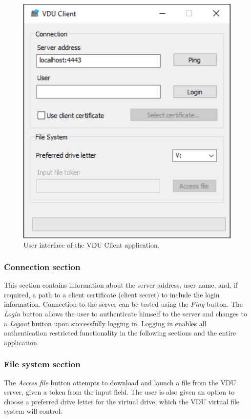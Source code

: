 \begin{figure}[H]
    \centering
    \includegraphics[]{obrazky-figures/clientui.pdf}
	\caption{User interface of the VDU Client application.}
	\label{clientui}
\end{figure}

\subsubsection{Connection section}
This section contains information about the server address, user name, and, if required, a path to a client certificate (client secret) to include the login information. Connection to the server can be tested using the \textit{Ping} button. The \textit{Login} button allows the user to authenticate himself to the server and changes to a \textit{Logout} button upon successfully logging in. Logging in enables all authentication restricted functionality in the following sections and the entire application.

\subsubsection{File system section}
The \textit{Access file} button attempts to download and launch a file from the VDU server, given a token from the input field. The user is also given an option to choose a preferred drive letter for the virtual drive, which the VDU virtual file system will control.

